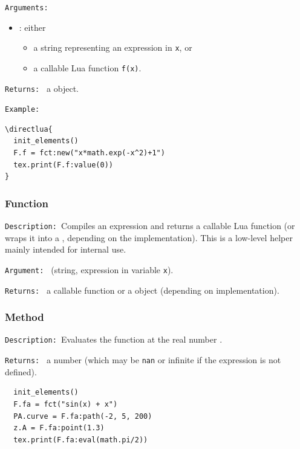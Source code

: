 \medskip
\texttt{Arguments: }\par
\begin{itemize}
\item {}: either
  \begin{itemize}
    \item a string representing an expression in \texttt{x}, or
    \item a callable Lua function \texttt{f(x)}.
  \end{itemize}
\end{itemize}

\medskip
\texttt{Returns: } a  object.

\medskip
\texttt{Example: }
\begin{verbatim}
\directlua{
  init_elements()
  F.f = fct:new("x*math.exp(-x^2)+1")
  tex.print(F.f:value(0))
}
\end{verbatim}



\subsubsection{Function }
\label{ssub:method_fct_compile}

\texttt{Description: }Compiles an expression and returns a callable Lua function
(or wraps it into a , depending on the implementation). This is a
low-level helper mainly intended for internal use.

\medskip
\texttt{Argument: }  (string, expression in variable \texttt{x}). \qquad

\medskip
\texttt{Returns: } a callable function or a  object (depending on implementation).

\subsubsection{Method }
\label{ssub:method_fct_value}

\texttt{Description: }Evaluates the function at the real number .

\medskip
\texttt{Returns: } a number (which may be \texttt{nan} or infinite if the expression is not defined).

\begin{verbatim}
  init_elements()
  F.fa = fct("sin(x) + x")
  PA.curve = F.fa:path(-2, 5, 200)
  z.A = F.fa:point(1.3)
  tex.print(F.fa:eval(math.pi/2))
\end{verbatim}


